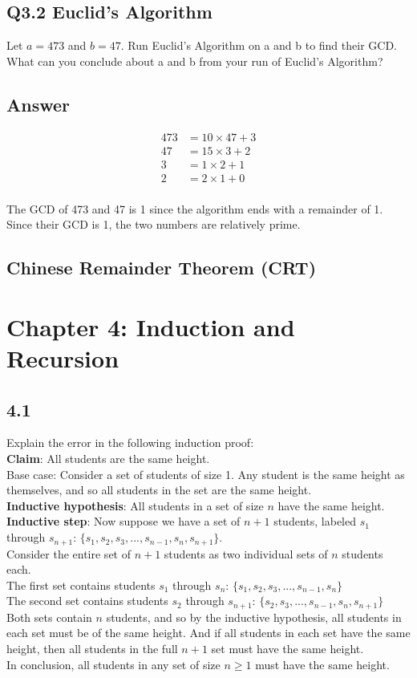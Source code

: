 \documentclass{article}
\begin{document}
\subsection*{Q3.2 Euclid's Algorithm}

Let $a = 473$ and $b = 47$. Run Euclid's Algorithm on a and b to find their GCD. What can you conclude about a and b from your run of Euclid's Algorithm?

\subsection*{Answer}

\begin{align*}
473 &= 10 \times 47 + 3 \\
47 &= 15 \times 3 + 2 \\
3 &= 1 \times 2 + 1 \\
2 &= 2 \times 1 + 0 \\
\end{align*}

The GCD of 473 and 47 is 1 since the algorithm ends with a remainder of 1. Since their GCD is 1, the two numbers are relatively prime.
\newpage
\subsection*{Chinese Remainder Theorem (CRT)}
\newpage
\section*{Chapter 4: Induction and Recursion}
\subsection*{4.1}
Explain the error in the following induction proof:
\\ \textbf{Claim}: All students are the same height.
\\ Base case: Consider a set of students of size 1. Any student is the same height as themselves, and so all students in the set are the same height.
\\ \textbf{Inductive hypothesis}: All students in a set of size $n$ have the same height. 
\\ \textbf{Inductive step}: Now suppose we have a set of $n+1$ students, labeled $s_1$ through $s_{n+1}$: $\{s_1,s_2,s_3,...,s_{n-1},s_n,s_{n+1}\}$.
\\ Consider the entire set of $n+1$ students as two individual sets of $n$ students each.
\\ The first set contains students $s_1$ through $s_n$: $\{s_1,s_2,s_3,...,s_{n-1},s_n\}$
\\ The second set contains students $s_2$ through $s_{n+1}$: $\{s_2,s_3,...,s_{n-1},s_n,s_{n+1}\}$
\\ Both sets contain $n$ students, and so by the inductive hypothesis, all students in each set must be of the same height. And if all students in each set have the same height, then all students in the full $n+1$ set must have the same height.
\\ In conclusion, all students in any set of size $n\geq1$ must have the same height.
\newpage
\end{document}
